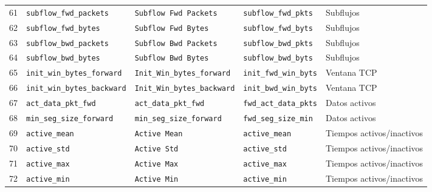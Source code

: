 \begin{landscape}
\begin{longtable}{@{}r p{4.2cm} p{4.4cm} p{4.1cm} p{4.8cm}@{}}
61 & \texttt{subflow\_\allowbreak{}fwd\_\allowbreak{}packets} & \texttt{Subflow Fwd Packets} & \texttt{subflow\_\allowbreak{}fwd\_\allowbreak{}pkts} & Subflujos \\
62 & \texttt{subflow\_\allowbreak{}fwd\_\allowbreak{}bytes} & \texttt{Subflow Fwd Bytes} & \texttt{subflow\_\allowbreak{}fwd\_\allowbreak{}byts} & Subflujos \\
63 & \texttt{subflow\_\allowbreak{}bwd\_\allowbreak{}packets} & \texttt{Subflow Bwd Packets} & \texttt{subflow\_\allowbreak{}bwd\_\allowbreak{}pkts} & Subflujos \\
64 & \texttt{subflow\_\allowbreak{}bwd\_\allowbreak{}bytes} & \texttt{Subflow Bwd Bytes} & \texttt{subflow\_\allowbreak{}bwd\_\allowbreak{}byts} & Subflujos \\
65 & \texttt{init\_\allowbreak{}win\_\allowbreak{}bytes\_\allowbreak{}forward} & \texttt{Init\_\allowbreak{}Win\_\allowbreak{}bytes\_\allowbreak{}forward} & \texttt{init\_\allowbreak{}fwd\_\allowbreak{}win\_\allowbreak{}byts} & Ventana TCP \\
66 & \texttt{init\_\allowbreak{}win\_\allowbreak{}bytes\_\allowbreak{}backward} & \texttt{Init\_\allowbreak{}Win\_\allowbreak{}bytes\_\allowbreak{}backward} & \texttt{init\_\allowbreak{}bwd\_\allowbreak{}win\_\allowbreak{}byts} & Ventana TCP \\
67 & \texttt{act\_\allowbreak{}data\_\allowbreak{}pkt\_\allowbreak{}fwd} & \texttt{act\_\allowbreak{}data\_\allowbreak{}pkt\_\allowbreak{}fwd} & \texttt{fwd\_\allowbreak{}act\_\allowbreak{}data\_\allowbreak{}pkts} & Datos activos \\
68 & \texttt{min\_\allowbreak{}seg\_\allowbreak{}size\_\allowbreak{}forward} & \texttt{min\_\allowbreak{}seg\_\allowbreak{}size\_\allowbreak{}forward} & \texttt{fwd\_\allowbreak{}seg\_\allowbreak{}size\_\allowbreak{}min} & Datos activos \\
69 & \texttt{active\_\allowbreak{}mean} & \texttt{Active Mean} & \texttt{active\_\allowbreak{}mean} & Tiempos activos/inactivos \\
70 & \texttt{active\_\allowbreak{}std} & \texttt{Active Std} & \texttt{active\_\allowbreak{}std} & Tiempos activos/inactivos \\
71 & \texttt{active\_\allowbreak{}max} & \texttt{Active Max} & \texttt{active\_\allowbreak{}max} & Tiempos activos/inactivos \\
72 & \texttt{active\_\allowbreak{}min} & \texttt{Active Min} & \texttt{active\_\allowbreak{}min} & Tiempos activos/inactivos \\

\end{longtable}
\end{landscape}
